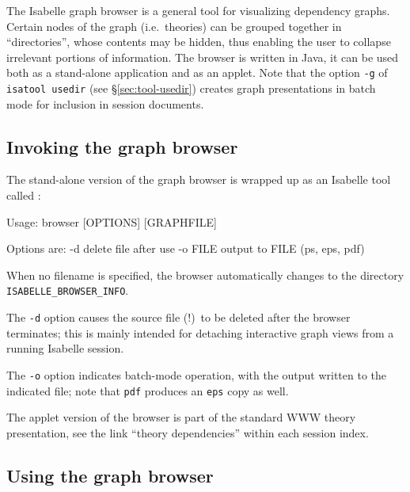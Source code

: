 The Isabelle graph browser is a general tool for visualizing dependency
graphs.  Certain nodes of the graph (i.e.~theories) can be grouped together in
``directories'', whose contents may be hidden, thus enabling the user to
collapse irrelevant portions of information.  The browser is written in Java,
it can be used both as a stand-alone application and as an applet.  Note that
the option \texttt{-g} of \texttt{isatool usedir} (see
\S\ref{sec:tool-usedir}) creates graph presentations in batch mode for
inclusion in session documents.


\subsection{Invoking the graph browser}

The stand-alone version of the graph browser is wrapped up as an
Isabelle tool called :
\begin{ttbox}
Usage: browser [OPTIONS] [GRAPHFILE]

  Options are:
    -d           delete file after use
    -o FILE      output to FILE (ps, eps, pdf)
\end{ttbox}
When no filename is specified, the browser automatically changes to the
directory \texttt{ISABELLE_BROWSER_INFO}.

\medskip The \texttt{-d} option causes the source file (!)\ to be deleted
after the browser terminates; this is mainly intended for detaching
interactive graph views from a running Isabelle session.

The \texttt{-o} option indicates batch-mode operation, with the output written
to the indicated file; note that \texttt{pdf} produces an \texttt{eps} copy as
well.

\medskip The applet version of the browser is part of the standard WWW theory
presentation, see the link ``theory dependencies'' within each session index.


\subsection{Using the graph browser}

